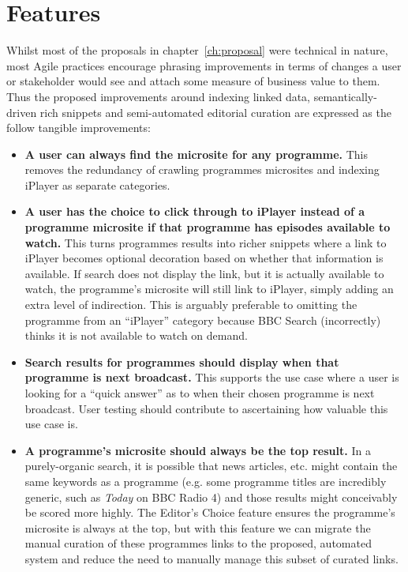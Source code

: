 \section{Features}

Whilst most of the proposals in chapter~\ref{ch:proposal} were
technical in nature, most Agile practices encourage phrasing
improvements in terms of changes a user or stakeholder would see
and attach some measure of business value to them. Thus the proposed
improvements around indexing linked data, semantically-driven rich
snippets and semi-automated editorial curation are expressed as
the follow tangible improvements:

\begin{itemize}

\item \textbf{A user can always find the microsite for any programme.}
  This removes the redundancy
  of crawling programmes microsites and indexing iPlayer as separate categories.

\item \textbf{A user has the choice to click through to iPlayer instead of a programme microsite if that programme has episodes available to watch.}
  This turns programmes results into richer
  snippets where a link to iPlayer becomes optional decoration based on whether that information
  is available. If search does not display the link, but it is actually available to watch, the
  programme's microsite will still link to iPlayer, simply adding an extra level of indirection. This
  is arguably preferable to omitting the programme from an ``iPlayer'' category because BBC Search
  (incorrectly) thinks it is not available to watch on demand.

\item \textbf{Search results for programmes should display when that programme is next broadcast.}
  This supports the use case where a user is looking for a ``quick answer'' as to when
  their chosen programme is next broadcast. User testing should contribute to ascertaining how valuable
  this use case is.

\item \textbf{A programme's microsite should always be the top result.}
  In a purely-organic search, it
  is possible that news articles, etc. might contain the same keywords as a programme (e.g. some programme
  titles are incredibly generic, such as \emph{Today} on BBC Radio 4) and those results might conceivably
  be scored more highly. The Editor's Choice feature ensures the programme's microsite is always at
  the top, but with this feature we can migrate the manual curation of these programmes links to
  the proposed, automated system and reduce the need to manually manage this subset of curated links.


\end{itemize}
